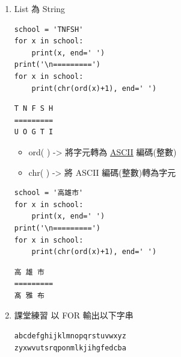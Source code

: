 \documentclass[a4paper,12pt]{article}
\begin{document}
\begin{enumerate}
\item List 為 String
\label{sec:orgca82202}
\lstset{breaklines=true,language=Python,label= ,caption= ,captionpos=b,firstnumber=1,numbers=left}
\begin{lstlisting}
school = 'TNFSH'
for x in school:
    print(x, end=' ')
print('\n=========')
for x in school:
    print(chr(ord(x)+1), end=' ')
\end{lstlisting}

\begin{verbatim}
T N F S H 
=========
U O G T I 
\end{verbatim}


\begin{itemize}
\item ord( ) -> 將字元轉為 \href{https://zh.wikipedia.org/wiki/ASCII}{ASCII} 編碼(整數)\\
\item chr( ) -> 將 ASCII 編碼(整數)轉為字元\\
\end{itemize}

\lstset{breaklines=true,language=Python,label= ,caption= ,captionpos=b,firstnumber=1,numbers=left}
\begin{lstlisting}
school = '高雄市'
for x in school:
    print(x, end=' ')
print('\n=========')
for x in school:
    print(chr(ord(x)+1), end=' ')

\end{lstlisting}

\begin{verbatim}
高 雄 市
=========
髙 雅 布
\end{verbatim}

\item 課堂練習
\label{sec:org175926d}
以 FOR 輸出以下字串\\
\begin{verbatim}
abcdefghijklmnopqrstuvwxyz
zyxwvutsrqponmlkjihgfedcba
\end{verbatim}
\end{enumerate}
\end{document}
